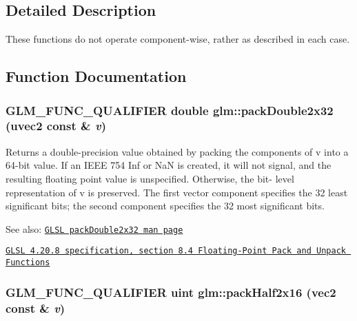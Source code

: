 \subsection{Detailed Description}
These functions do not operate component-wise, rather as described in each case. 

\subsection{Function Documentation}
\hypertarget{group__core__func__packing_gf728fdfb98ce34da6f968d9f6bf154d7}{
\subsubsection[packDouble2x32]{\setlength{\rightskip}{0pt plus 5cm}GLM\_\-FUNC\_\-QUALIFIER double glm::packDouble2x32 (uvec2 const \& {\em v})}}
\label{group__core__func__packing_gf728fdfb98ce34da6f968d9f6bf154d7}


Returns a double-precision value obtained by packing the components of v into a 64-bit value. If an IEEE 754 Inf or NaN is created, it will not signal, and the resulting floating point value is unspecified. Otherwise, the bit- level representation of v is preserved. The first vector component specifies the 32 least significant bits; the second component specifies the 32 most significant bits.

\begin{Desc}
\item[See also:]\href{http://www.opengl.org/sdk/docs/manglsl/xhtml/packDouble2x32.xml}{\tt GLSL packDouble2x32 man page} 

\href{http://www.opengl.org/registry/doc/GLSLangSpec.4.20.8.pdf}{\tt GLSL 4.20.8 specification, section 8.4 Floating-Point Pack and Unpack Functions} \end{Desc}
\hypertarget{group__core__func__packing_g082f6dd65f73a547ed3067ef00be036f}{
\subsubsection[packHalf2x16]{\setlength{\rightskip}{0pt plus 5cm}GLM\_\-FUNC\_\-QUALIFIER uint glm::packHalf2x16 (vec2 const \& {\em v})}}
\label{group__core__func__packing_g082f6dd65f73a547ed3067ef00be036f}


